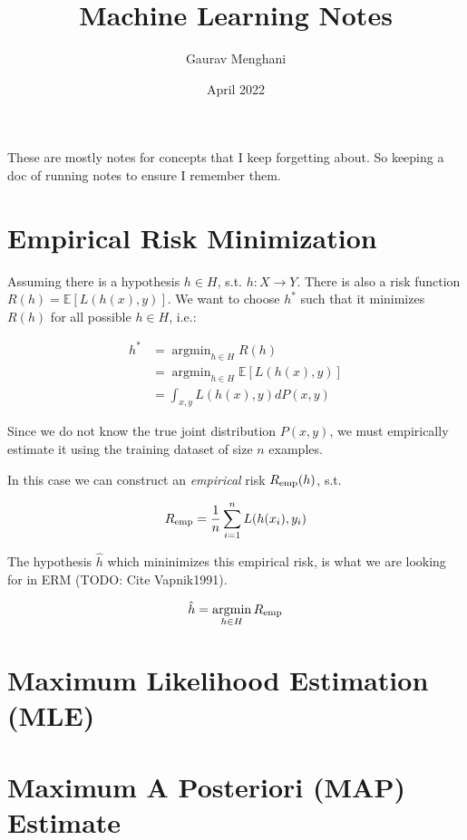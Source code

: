 \documentclass{article}
\title{Machine Learning Notes}
\author{Gaurav Menghani}
\date{April 2022}
\newcommand\ddfrac[2]{\frac{\displaystyle #1}{\displaystyle #2}}
\DeclareMathOperator*{\argmin}{argmin}
\begin{document}
\maketitle

These are mostly notes for concepts that I keep forgetting about. So keeping a doc of running notes to ensure I remember them.

\section{Empirical Risk Minimization}
Assuming there is a hypothesis $h \in H$, s.t. $h: X \to Y$. There is also a risk function $R(h) = \mathbb{E} [L(h(x), y)]$. We want to choose $h^*$ such that it minimizes $R(h)$ for all possible $h \in H$, i.e.:

\begin{equation}
\begin{split}
    h^*& = \argmin_{h \in H} R(h)\\
    & = \argmin_{h \in H} \mathbb{E} [L(h(x), y)]\\
    & = \int_{x, y} L(h(x), y) dP(x, y)
\end{split}
\end{equation}

Since we do not know the true joint distribution $P(x, y)$, we must empirically estimate it using the training dataset of size $n$ examples.

In this case we can construct an \textit{empirical} risk $R_{\rm emp}(h)$, s.t.

\begin{equation}
    R_{\rm emp} = \ddfrac{1}{n} \sum_{i=1}^{n} L(h(x_i), y_i)
\end{equation}

The hypothesis $\hat{h}$ which mininimizes this empirical risk, is what we are looking for in ERM (TODO: Cite Vapnik1991).

\begin{equation}
    \hat{h} = \argmin_{h \in H} R_{\rm emp}
\end{equation}

\section{Maximum Likelihood Estimation (MLE)}

\section{Maximum A Posteriori (MAP) Estimate}
\end{document}
